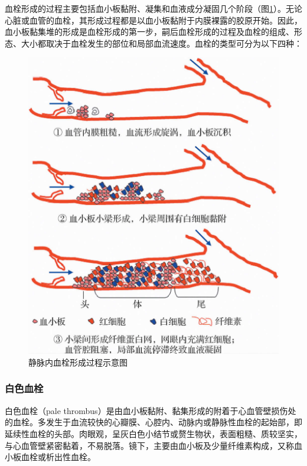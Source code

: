 血栓形成的过程主要包括血小板黏附、凝集和血液成分凝固几个阶段（图\ref{fig3-6}）。无论心脏或血管的血栓，其形成过程都是以血小板黏附于内膜裸露的胶原开始。因此，血小板黏集堆的形成是血栓形成的第一步，嗣后血栓形成的过程及血栓的组成、形态、大小都取决于血栓发生的部位和局部血流速度。血栓的类型可分为以下四种：

\begin{figure}[!htbp]
  \centering
  \includegraphics{./images/Image00039.jpg}
  \caption{静脉内血栓形成过程示意图}
  \label{fig3-6}
\end{figure}

\subsubsection{白色血栓}

白色血栓（pale
thrombus）是由血小板黏附、黏集形成的附着于心血管壁损伤处的血栓。多发生于血流较快的心瓣膜、心腔内、动脉内或静脉性血栓的起始部，即延续性血栓的头部。肉眼观，呈灰白色小结节或赘生物状，表面粗糙、质较坚实，与心血管壁紧密黏着，不易脱落。镜下，主要由血小板及少量纤维素构成，又称血小板血栓或析出性血栓。


